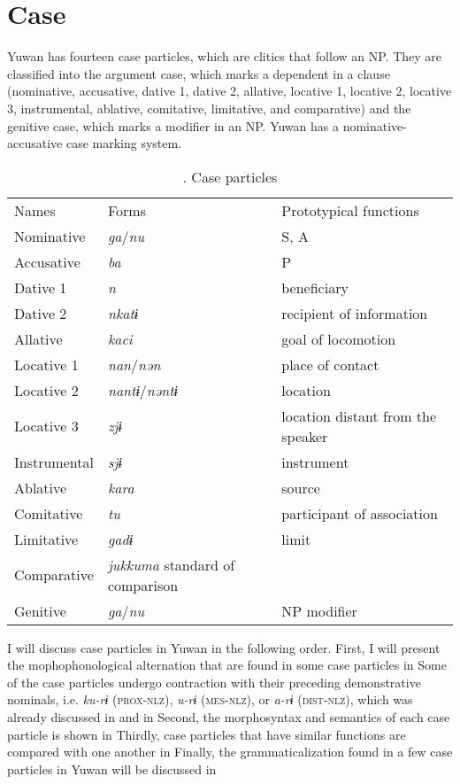 \section{Case}

Yuwan has fourteen case particles, which are clitics that follow an NP. They are classified into the argument case, which marks a dependent in a clause (nominative, accusative, dative 1, dative 2, allative, locative 1, locative 2, locative 3, instrumental, ablative, comitative, limitative, and comparative) and the genitive case, which marks a modifier in an NP. Yuwan has a nominative-accusative case marking system.

\begin{table}
\caption{\label{tab:key:40}. Case particles}
\begin{tabular}{lll}
Names & Forms & Prototypical functions \\
Nominative & \textit{ga}/\textit{nu} & S, A \\
Accusative & \textit{ba} & P \\
Dative 1 & \textit{n} & beneficiary \\
Dative 2 & \textit{nkatɨ} & recipient of information \\
Allative & \textit{kaci} & goal of locomotion \\
Locative 1 & \textit{nan}/\textit{nən} & place of contact \\
Locative 2 & \textit{nantɨ}/\textit{nəntɨ}& location \\
Locative 3 & \textit{zjɨ} & location distant from the speaker \\
Instrumental & \textit{sjɨ} & instrument \\
Ablative & \textit{kara} & source \\
Comitative & \textit{tu} & participant of association \\
Limitative & \textit{gadɨ} & limit \\
Comparative & \textit{jukkuma} standard of comparison \\
Genitive & \textit{ga}/\textit{nu} & NP modifier \\
\end{tabular}
\end{table}
I will discuss case particles in Yuwan in the following order. First, I will present the mophophonological alternation that are found in some case particles in  Some of the case particles undergo contraction with their preceding demonstrative nominals, i.e. \textit{ku-rɨ} (\textsc{prox}-\textsc{nlz}), \textit{u-rɨ} (\textsc{mes}-\textsc{nlz}), or \textit{a-rɨ} (\textsc{dist}-\textsc{nlz}), which was already discussed in  and  in  Second, the morphosyntax and semantics of each case particle is shown in  Thirdly, case particles that have similar functions are compared with one another in  Finally, the grammaticalization found in a few case particles in Yuwan will be discussed in 

